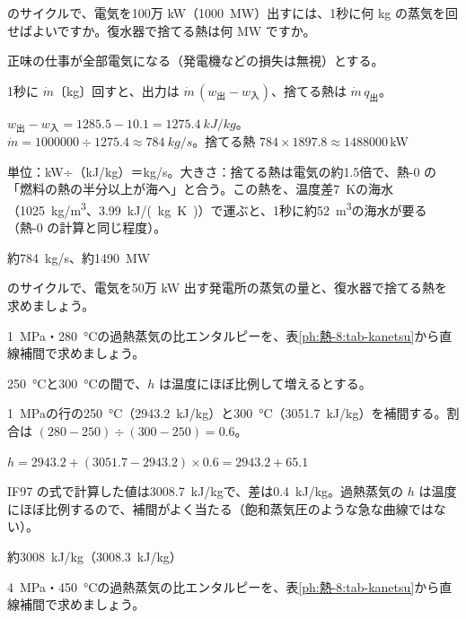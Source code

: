 \begin{reidai}[100万 kW の発電所が捨てる熱]
\label{ph:熱-8:ex11}のサイクルで、電気を100万 kW（\qty{1000}{MW}）出すには、1秒に何 kg の蒸気を回せばよいですか。復水器で捨てる熱は何 MW ですか。
\par{} 正味の仕事が全部電気になる（発電機などの損失は無視）とする。
\par\kangaekata 1秒に $\dot m$〔kg〕回すと、出力は $\dot m\,(w_{\text{出}}-w_{\text{入}})$、捨てる熱は $\dot m\,q_{\text{出}}$。
\par\shiki $w_{\text{出}}-w_{\text{入}}=1285.5-10.1=\qty{1275.4}{kJ/kg}$。\\ \hspace*{2\zw}$\dot m=\num{1000000}\div1275.4\approx\qty{784}{kg/s}$。捨てる熱 $784\times1897.8\approx\num{1488000}$\,kW
\par{} 単位：kW÷（kJ/kg）＝kg/s。大きさ：捨てる熱は電気の約1.5倍で、熱-0 の「燃料の熱の半分以上が海へ」と合う。この熱を、温度差\qty{7}{K}の海水（\qty{1025}{kg/m^3}、\qty{3.99}{kJ/(kg.K)}）で運ぶと、1秒に約\qty{52}{m^3}の海水が要る（熱-0 の計算と同じ程度）。
\par\kotae 約\qty{784}{kg/s}、約\qty{1490}{MW}
\end{reidai}
\begin{jibun}
のサイクルで、電気を50万 kW 出す発電所の蒸気の量と、復水器で捨てる熱を求めましょう。
\end{jibun}

\begin{reidai}[過熱蒸気表を補間して読む]
\label{ph:熱-8:ex12}\qty{1}{MPa}・\qty{280}{\celsius}の過熱蒸気の比エンタルピーを、表\ref{ph:熱-8:tab-kanetsu}から直線補間で求めましょう。
\par{} \qty{250}{\celsius}と\qty{300}{\celsius}の間で、$h$ は温度にほぼ比例して増えるとする。
\par\kangaekata \qty{1}{MPa}の行の\qty{250}{\celsius}（\qty{2943.2}{kJ/kg}）と\qty{300}{\celsius}（\qty{3051.7}{kJ/kg}）を補間する。割合は $(280-250)\div(300-250)=0.6$。
\par\shiki $h=2943.2+(3051.7-2943.2)\times0.6=2943.2+65.1$
\par{} IF97 の式で計算した値は\qty{3008.7}{kJ/kg}で、差は\qty{0.4}{kJ/kg}。過熱蒸気の $h$ は温度にほぼ比例するので、補間がよく当たる（飽和蒸気圧のような急な曲線ではない）。
\par\kotae 約\qty{3008}{kJ/kg}（\qty{3008.3}{kJ/kg}）
\end{reidai}
\begin{jibun}
\qty{4}{MPa}・\qty{450}{\celsius}の過熱蒸気の比エンタルピーを、表\ref{ph:熱-8:tab-kanetsu}から直線補間で求めましょう。
\end{jibun}

